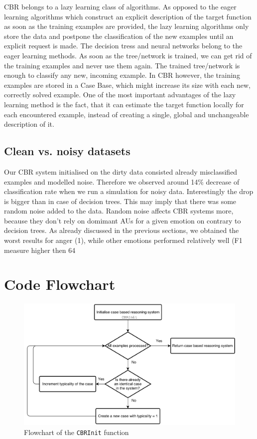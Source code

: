 \documentclass[a4paper]{article}
\begin{document}
CBR belongs to a lazy learning class of algorithms. As opposed to the eager learning algorithms which construct an explicit description of the target function as soon as the training examples are provided, the lazy learning algorithms only store the data and postpone the classification of the new examples until an explicit request is made. The decision tress and neural networks belong to the eager learning methods. As soon as the tree/network is trained, we can get rid of the training examples and never use them again. The trained tree/network is enough to classify any new, incoming example. In CBR however, the training examples are stored in a Case Base, which might increase its size with each new, correctly solved example. One of the most important advantages of the lazy learning method is the fact, that it can estimate the target function locally for each encountered example, instead of creating a single, global and unchangeable description of it.

\subsection{Clean vs. noisy datasets}
Our CBR system initialised on the dirty data consisted already misclassified examples and modelled noise. Therefore we observed around 14\% decrease of classification rate when we run a simulation for noisy data. Interestingly the drop is bigger than in case of decision trees. This may imply that there was some random noise added to the data. Random noise affects CBR systems more, because they don't rely on domimant AUs for a given emotion on contrary to decision trees. As already discussed in the previous sections, we obtained the worst results for anger (1), while other emotions performed relatively well (F1 measure higher then 64%


\clearpage


\section{Code Flowchart}

\begin{figure}[H]
\center
\includegraphics[width=0.9\columnwidth]{CBRInit}
\caption{Flowchart of the \texttt{CBRInit} function}
\label{flowchartCBRInit}
\end{figure}
\end{document}
